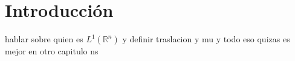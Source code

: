 %

\chapter{Introducción}
 hablar sobre quien es $L^1(\mathbb{R}^n)$ y definir traslacion y mu  y todo eso  quizas es mejor en otro capitulo ns 